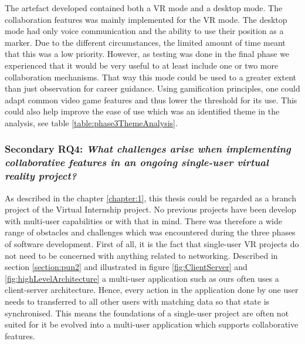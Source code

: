 The artefact developed contained both a VR mode and a desktop mode. The collaboration features was mainly implemented for the VR mode.   
The desktop mode had only voice communication and the ability to use their position as a marker. Due to the different circumstances, the limited amount of time meant that this was a low priority. However, as testing was done in the final phase we experienced that it would be very useful to at least include one or two more collaboration mechanisms. That way this mode could be used to a greater extent than just observation for career guidance. Using gamification principles, one could adapt common video game features and thus lower the threshold for its use. This could also help improve the ease of use which was an identified theme in the analysis, see table \ref{table:phase3ThemeAnalysis}.  




\subsubsection{Secondary RQ4: \textit{What challenges arise when implementing collaborative features in an ongoing
single-user virtual reality project?}} 

As described in the chapter \ref{chapter:1}, this thesis could be regarded as a branch project of the Virtual Internship project. No previous projects have been develop with multi-user capabilities or with that in mind. There was therefore a wide range of obstacles and challenges which was encountered during the three phases of software development. First of all, it is the fact that single-user VR projects do not need to be concerned with anything related to networking. Described in section \ref{section:pun2} and illustrated in figure \ref{fig:ClientServer} and \ref{fig:highLevelArchitecture} a multi-user application such as ours often uses a client-server architecture. Hence, every action in the application done by one user needs to transferred to all other users with matching data so that state is synchronised. This means the foundations of a single-user project are often not suited for it be evolved into a multi-user application which supports collaborative features.


